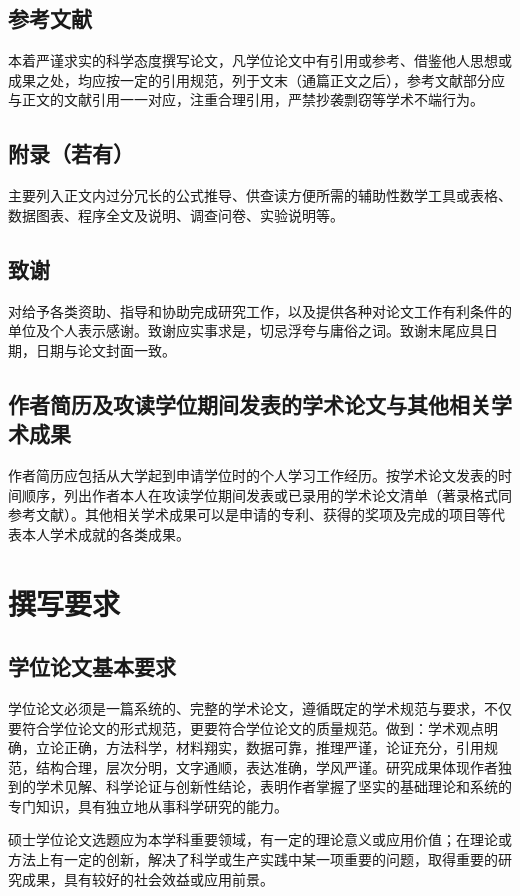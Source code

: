 \subsection{参考文献}
本着严谨求实的科学态度撰写论文，凡学位论文中有引用或参考、借鉴他人思想或成果之处，均应按一定的引用规范，列于文末（通篇正文之后），参考文献部分应与正文的文献引用一一对应，注重合理引用，严禁抄袭剽窃等学术不端行为。
\subsection{附录（若有）}
主要列入正文内过分冗长的公式推导、供查读方便所需的辅助性数学工具或表格、数据图表、程序全文及说明、调查问卷、实验说明等。
\subsection{致谢}
对给予各类资助、指导和协助完成研究工作，以及提供各种对论文工作有利条件的单位及个人表示感谢。致谢应实事求是，切忌浮夸与庸俗之词。致谢末尾应具日期，日期与论文封面一致。
\subsection{作者简历及攻读学位期间发表的学术论文与其他相关学术成果}
作者简历应包括从大学起到申请学位时的个人学习工作经历。按学术论文发表的时间顺序，列出作者本人在攻读学位期间发表或已录用的学术论文清单（著录格式同参考文献）。其他相关学术成果可以是申请的专利、获得的奖项及完成的项目等代表本人学术成就的各类成果。


\section{撰写要求}

\subsection{学位论文基本要求}
学位论文必须是一篇系统的、完整的学术论文，遵循既定的学术规范与要求，不仅要符合学位论文的形式规范，更要符合学位论文的质量规范。做到：学术观点明确，立论正确，方法科学，材料翔实，数据可靠，推理严谨，论证充分，引用规范，结构合理，层次分明，文字通顺，表达准确，学风严谨。研究成果体现作者独到的学术见解、科学论证与创新性结论，表明作者掌握了坚实的基础理论和系统的专门知识，具有独立地从事科学研究的能力。

硕士学位论文选题应为本学科重要领域，有一定的理论意义或应用价值；在理论或方法上有一定的创新，解决了科学或生产实践中某一项重要的问题，取得重要的研究成果，具有较好的社会效益或应用前景。

